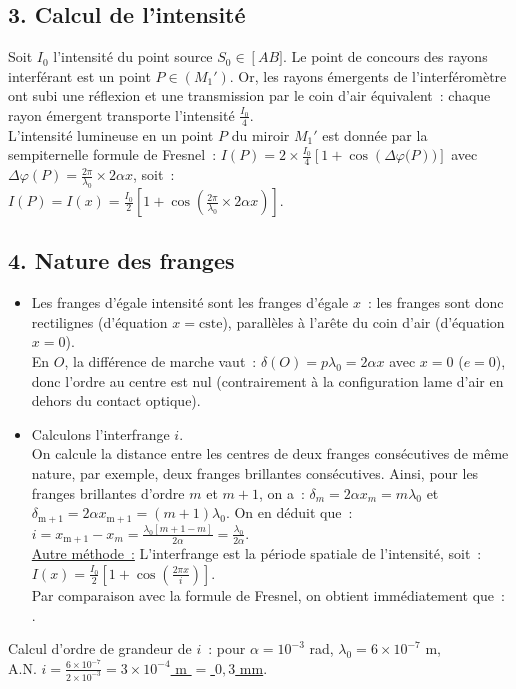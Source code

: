 \documentclass{article}
\newcommand{\mathcolorbox}[2]{\fcolorbox{black}{#1}{$#2$}}
\begin{document}
\subsection*{3. Calcul de l'intensité}
Soit $I_{0}$ l'intensité du point source $S_{0} \in \left[AB]$.
Le point de concours des rayons interférant est un point $P \in
\left(M_{1}'\right)$. Or, les rayons émergents de l'interféromètre ont subi une
réflexion et une transmission par le coin d'air équivalent : chaque
rayon
émergent transporte l'intensité $\frac{I_{0}}{4}$. \\
L'intensité lumineuse en un point $P$ du miroir $M_{1}'$ est donnée
par la sempiternelle formule de Fresnel : $I(P)=2\times
\frac{I_{0}}{4}\left[1+\cos\left(\Delta \varphi(P\right))\right]$ avec $\Delta \varphi(P)
= \frac{2\pi}{\lambda_{0}}\times 2\alpha x$, soit : \\
$I(P) = I(x) = \frac{I_{0}}{2}\left[1+\cos\left(\frac{2\pi}{\lambda_{0}}\times
2\alpha x\right)\right]$.

\subsection*{4. Nature des franges}
\begin{itemize}
\item Les franges d'égale intensité sont les franges d'égale $x$ : les
franges sont donc rectilignes (d'équation $x = \mathrm{cste}$), parallèles à
l'arête du coin d'air (d'équation $x = 0$). \\
En $O$, la différence de marche vaut : $\delta(O) = p\lambda_{0} =
2\alpha x$ avec $x  =0$ ($e = 0$), donc l'ordre au centre est nul
(contrairement à la configuration lame d'air en dehors du contact
optique).
\item Calculons l'interfrange $i$. \\
On calcule la distance entre les centres de deux franges
consécutives de même nature, par exemple, deux franges brillantes
consécutives. Ainsi, pour les franges brillantes d'ordre $m$ et
$m+1$, on a : $\delta_{m} = 2\alpha x_{m} = m\lambda_{0}$ et
$\delta_{\mathrm{m+1}} = 2\alpha x_{\mathrm{m+1}} = (m+1)\lambda_{0}$. On en déduit
que : $i = x_{\mathrm{m+1}}-x_{m} = \frac{\lambda_{0}\left[m+1 -m\right]}{2\alpha} =
\frac{\lambda_{0}}{2\alpha}$.
\\
\underline{Autre méthode :} L'interfrange est la période spatiale de
l'intensité, soit : $I(x) =
\frac{I_{0}}{2}\left[1+\cos\left(\frac{2\pi x}{i}\right)\right]$. \\
Par comparaison avec la formule de Fresnel, on obtient immédiatement
que : \mathcolorbox{gray!20}{i = \frac{\lambda_{0}}{2\alpha}}.
\end{itemize}
Calcul d'ordre de grandeur de $i$ : pour $\alpha = 10^{-3}$ rad,
$\lambda_{0} = 6\times 10^{-7}$ m, \\
A.N. \underline{$i = \frac{6\times 10^{-7}}{2\times 10^{-3}} =
3\times 10^{-4}$ m $=$ $0,3$ mm}.
\end{document}
